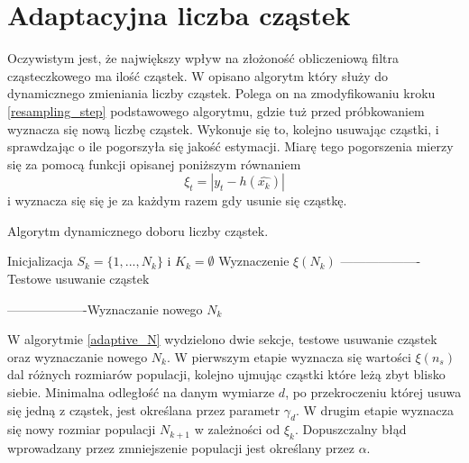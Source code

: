 \section{Adaptacyjna liczba cząstek} \label{adaptive_chapter}
Oczywistym jest, że największy wpływ na złożoność obliczeniową filtra cząsteczkowego ma ilość cząstek. W \cite{adaptive} opisano algorytm który służy do dynamicznego zmieniania liczby cząstek. Polega on na zmodyfikowaniu kroku \ref{resampling_step} podstawowego algorytmu, gdzie tuż przed próbkowaniem wyznacza się nową liczbę cząstek. Wykonuje się to, kolejno usuwając cząstki, i sprawdzając o ile pogorszyła się jakość estymacji. Miarę tego pogorszenia mierzy się za pomocą funkcji opisanej poniższym równaniem
\begin{equation}\label{ceana_pogorszenia}
	\xi_t = |y_t-h(\hat{x_k})|
\end{equation}
i wyznacza się się je za każdym razem gdy usunie się cząstkę.

\begin{algorithm}[H]
	\SetAlgoLined
	\DontPrintSemicolon
	\caption{Algorytm dynamicznego doboru liczby cząstek.} \label{adaptive_N}
	Inicjalizacja $S_k=\{1,...,N_k\}$ i $K_k=\emptyset$\;
	Wyznaczenie $\xi(N_k)$\;
	-------------------Testowe usuwanie cząstek\;

	-------------------Wyznaczanie nowego $N_k$\;
	
\end{algorithm}
W algorytmie \ref{adaptive_N} wydzielono dwie sekcje, testowe usuwanie cząstek oraz wyznaczanie nowego $N_k$. W pierwszym etapie wyznacza się wartości $\xi(n_s)$ dal różnych rozmiarów populacji, kolejno ujmując cząstki które leżą zbyt blisko siebie. Minimalna odległość na danym wymiarze $d$, po przekroczeniu której usuwa się jedną z cząstek, jest określana przez parametr $\gamma_d$. W drugim etapie wyznacza się nowy rozmiar populacji $N_{k+1}$ w zależności od $\xi_k$. Dopuszczalny błąd wprowadzany przez zmniejszenie populacji jest określany przez $\alpha$.


